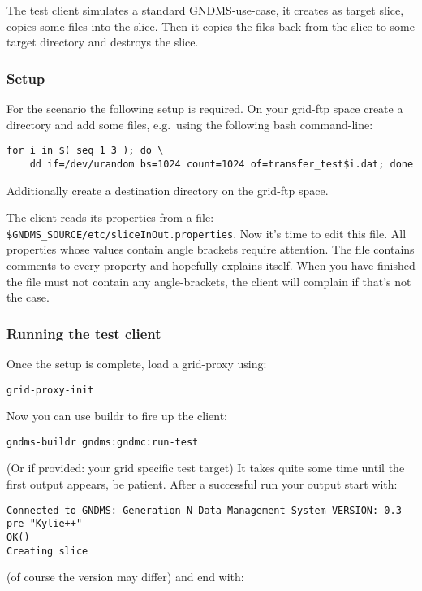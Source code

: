 \documentclass{article}
\begin{document}
The test client simulates a standard GNDMS-use-case, it creates as
target slice, copies some files into the slice. Then it copies the
files back from the slice to some target directory and destroys the
slice.

\subsubsection{Setup}

For the scenario the following setup is required. On your grid-ftp
space create a directory and add some files, e.g.~using the
following bash command-line:

\begin{verbatim}
for i in $( seq 1 3 ); do \
    dd if=/dev/urandom bs=1024 count=1024 of=transfer_test$i.dat; done
\end{verbatim}

Additionally create a destination directory on the grid-ftp space.

The client reads its properties from a file:
\verb!$GNDMS_SOURCE/etc/sliceInOut.properties!. Now it's time to
edit this file. All properties whose values contain angle brackets
require attention. The file contains comments to every property and
hopefully explains itself. When you have finished the file must not
contain any angle-brackets, the client will complain if that's not
the case.

\subsubsection{Running the test client}

Once the setup is complete, load a grid-proxy using:

\begin{verbatim}
grid-proxy-init
\end{verbatim}
Now you can use buildr to fire up the client:

\begin{verbatim}
gndms-buildr gndms:gndmc:run-test
\end{verbatim}
(Or if provided: your grid specific test target) It takes quite
some time until the first output appears, be patient. After a
successful run your output start with:

\begin{verbatim}
Connected to GNDMS: Generation N Data Management System VERSION: 0.3-pre "Kylie++"
OK()
Creating slice
\end{verbatim}
(of course the version may differ) and end with:
\end{document}
